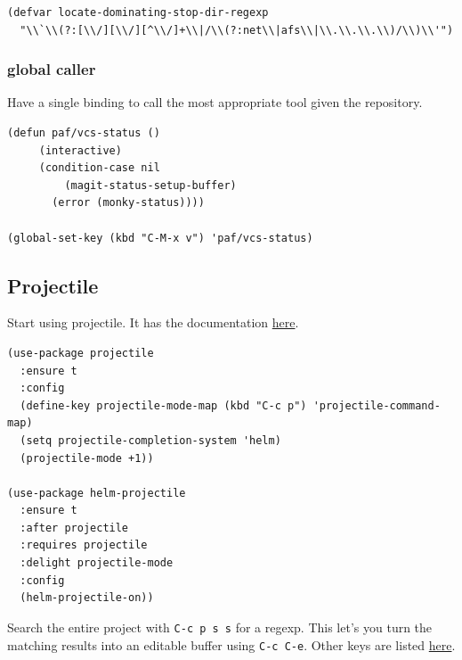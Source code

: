 \documentclass[11pt]{article}
\begin{document}
\begin{verbatim}
(defvar locate-dominating-stop-dir-regexp
  "\\`\\(?:[\\/][\\/][^\\/]+\\|/\\(?:net\\|afs\\|\\.\\.\\.\\)/\\)\\'")
\end{verbatim}
\subsubsection{global caller}
\label{sec:orgb34da25}

Have a single binding to call the most appropriate tool given the repository.

\begin{verbatim}
(defun paf/vcs-status ()
     (interactive)
     (condition-case nil
         (magit-status-setup-buffer)
       (error (monky-status))))

(global-set-key (kbd "C-M-x v") 'paf/vcs-status)
\end{verbatim}

\subsection{Projectile}
\label{sec:orgf0adbad}

Start using projectile. It has the documentation \href{https://docs.projectile.mx/en/latest/}{here}.

\begin{verbatim}
(use-package projectile
  :ensure t
  :config
  (define-key projectile-mode-map (kbd "C-c p") 'projectile-command-map)
  (setq projectile-completion-system 'helm)
  (projectile-mode +1))

(use-package helm-projectile
  :ensure t
  :after projectile
  :requires projectile
  :delight projectile-mode
  :config
  (helm-projectile-on))
\end{verbatim}

Search the entire project with \texttt{C-c p s s} for a regexp. This let's
you turn the matching results into an editable buffer using \texttt{C-c
C-e}. Other keys are listed \href{https://github.com/syohex/emacs-helm-ag\#keymap}{here}.
\end{document}
